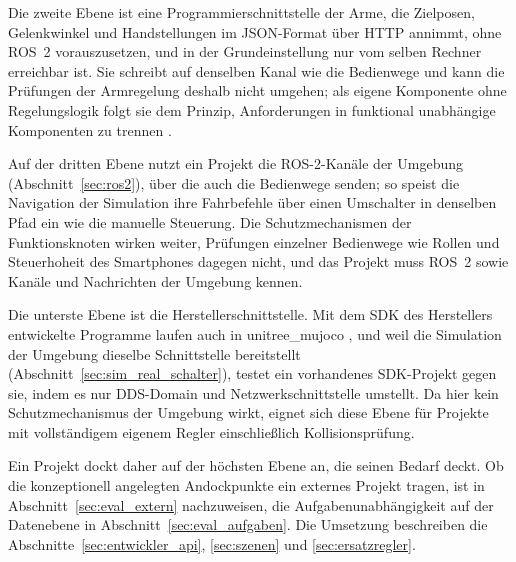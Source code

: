 Die zweite Ebene ist eine Programmierschnittstelle der Arme, die Zielposen, Gelenkwinkel und Handstellungen im
JSON-Format über HTTP annimmt, ohne ROS~2 vorauszusetzen, und in der Grundeinstellung nur vom selben Rechner
erreichbar ist.
Sie schreibt auf denselben Kanal wie die Bedienwege und kann die Prüfungen der Armregelung deshalb nicht umgehen; als
eigene Komponente ohne Regelungslogik folgt sie dem Prinzip, Anforderungen in funktional unabhängige Komponenten zu
trennen \cite{Macenski2022}.

Auf der dritten Ebene nutzt ein Projekt die ROS-2-Kanäle der Umgebung (Abschnitt~\ref{sec:ros2}), über die auch die
Bedienwege senden; so speist die Navigation der Simulation ihre Fahrbefehle über einen Umschalter in denselben Pfad
ein wie die manuelle Steuerung.
Die Schutzmechanismen der Funktionsknoten wirken weiter, Prüfungen einzelner Bedienwege wie Rollen und Steuerhoheit
des Smartphones dagegen nicht, und das Projekt muss ROS~2 sowie Kanäle und Nachrichten der Umgebung kennen.

Die unterste Ebene ist die Herstellerschnittstelle.
Mit dem SDK des Herstellers entwickelte Programme laufen auch in unitree\_mujoco \cite{UnitreeMujoco},
und weil die Simulation der Umgebung dieselbe Schnittstelle bereitstellt (Abschnitt~\ref{sec:sim_real_schalter}),
testet ein vorhandenes SDK-Projekt gegen sie, indem es nur DDS-Domain und Netzwerkschnittstelle umstellt.
Da hier kein Schutzmechanismus der Umgebung wirkt, eignet sich diese Ebene für Projekte mit vollständigem eigenem
Regler einschließlich Kollisionsprüfung.

Ein Projekt dockt daher auf der höchsten Ebene an, die seinen Bedarf deckt.
Ob die konzeptionell angelegten Andockpunkte ein externes Projekt tragen, ist in Abschnitt~\ref{sec:eval_extern}
nachzuweisen, die Aufgabenunabhängigkeit auf der Datenebene in Abschnitt~\ref{sec:eval_aufgaben}.
Die Umsetzung beschreiben die Abschnitte~\ref{sec:entwickler_api}, \ref{sec:szenen} und \ref{sec:ersatzregler}.


